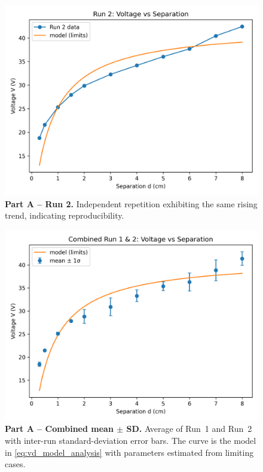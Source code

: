 \documentclass[12pt]{article}
\begin{document}
\begin{figure}[htbp]
\centering
\includegraphics[width=0.82\linewidth]{PartA_Run2.png}
\caption{\textbf{Part A -- Run 2.} Independent repetition exhibiting the same rising trend, indicating reproducibility.}
\label{fig:run2}
\end{figure}
\FloatBarrier

\begin{figure}[htbp]
\centering
\includegraphics[width=0.82\linewidth]{PartA_Combined.png}
\caption{\textbf{Part A -- Combined mean \(\pm\) SD.} Average of Run~1 and Run~2 with inter-run standard-deviation error bars. The curve is the model in \cref{eq:vd_model_analysis} with parameters estimated from limiting cases.}
\label{fig:combined}
\end{figure}
\end{document}
